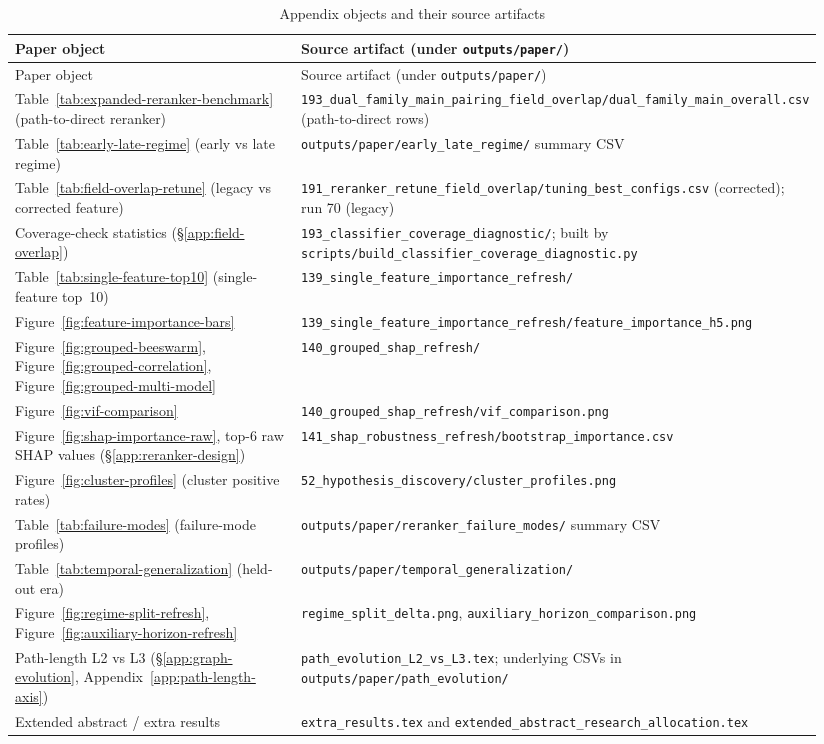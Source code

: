 \documentclass[11pt]{article}
\begin{document}
\begin{longtable}{L{0.36\linewidth}L{0.58\linewidth}}
  \caption{Appendix objects and their source artifacts}
  \label{tab:repro-appendix}\\
  \toprule
  Paper object & Source artifact (under \texttt{outputs/paper/}) \\
  \midrule
  \endfirsthead
  \toprule
  Paper object & Source artifact (under \texttt{outputs/paper/}) \\
  \midrule
  \endhead
  Table~\ref{tab:expanded-reranker-benchmark} (path-to-direct reranker) & \texttt{193\_dual\_family\_main\_pairing\_field\_overlap/dual\_family\_main\_overall.csv} (path-to-direct rows) \\
  Table~\ref{tab:early-late-regime} (early vs late regime) & \texttt{outputs/paper/early\_late\_regime/} summary CSV \\
  Table~\ref{tab:field-overlap-retune} (legacy vs corrected feature) & \texttt{191\_reranker\_retune\_field\_overlap/tuning\_best\_configs.csv} (corrected); run 70 (legacy) \\
  Coverage-check statistics (\S\ref{app:field-overlap}) & \texttt{193\_classifier\_coverage\_diagnostic/}; built by \texttt{scripts/build\_classifier\_coverage\_diagnostic.py} \\
  Table~\ref{tab:single-feature-top10} (single-feature top~10) & \texttt{139\_single\_feature\_importance\_refresh/} \\
  Figure~\ref{fig:feature-importance-bars} & \texttt{139\_single\_feature\_importance\_refresh/feature\_importance\_h5.png} \\
  Figure~\ref{fig:grouped-beeswarm}, Figure~\ref{fig:grouped-correlation}, Figure~\ref{fig:grouped-multi-model} & \texttt{140\_grouped\_shap\_refresh/} \\
  Figure~\ref{fig:vif-comparison} & \texttt{140\_grouped\_shap\_refresh/vif\_comparison.png} \\
  Figure~\ref{fig:shap-importance-raw}, top-6 raw SHAP values (\S\ref{app:reranker-design}) & \texttt{141\_shap\_robustness\_refresh/bootstrap\_importance.csv} \\
  Figure~\ref{fig:cluster-profiles} (cluster positive rates) & \texttt{52\_hypothesis\_discovery/cluster\_profiles.png} \\
  Table~\ref{tab:failure-modes} (failure-mode profiles) & \texttt{outputs/paper/reranker\_failure\_modes/} summary CSV \\
  Table~\ref{tab:temporal-generalization} (held-out era) & \texttt{outputs/paper/temporal\_generalization/} \\
  Figure~\ref{fig:regime-split-refresh}, Figure~\ref{fig:auxiliary-horizon-refresh} & \texttt{regime\_split\_delta.png}, \texttt{auxiliary\_horizon\_comparison.png} \\
  Path-length L2 vs L3 (\S\ref{app:graph-evolution}, Appendix~\ref{app:path-length-axis}) & \texttt{path\_evolution\_L2\_vs\_L3.tex}; underlying CSVs in \texttt{outputs/paper/path\_evolution/} \\
  Extended abstract / extra results & \texttt{extra\_results.tex} and \texttt{extended\_abstract\_research\_allocation.tex} \\
  \bottomrule
\end{longtable}
\end{document}
